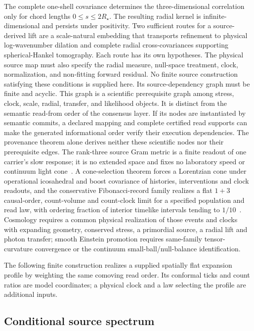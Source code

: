 \documentclass[11pt]{article}
\theoremstyle{remark}
\begin{document}
The complete one-shell covariance determines the three-dimensional correlation
only for chord lengths \(0\le s\le2R_\star\). The resulting radial kernel is
infinite-dimensional and persists under positivity. Two sufficient routes
for a source-derived lift are a scale-natural embedding that transports
refinement to physical log-wavenumber dilation and complete radial
cross-covariances supporting spherical-Hankel tomography. Each route has its
own hypotheses. The physical source map must also specify
the radial measure, null-space treatment, clock, normalization, and non-fitting
forward residual. No finite source construction satisfying these conditions is
supplied here. Its source-dependency graph must be finite and acyclic.
This graph is a scientific prerequisite graph among stress, clock, scale,
radial, transfer, and likelihood objects. It is distinct from the semantic
read-from order of the consensus layer. If its nodes are instantiated by
semantic commits, a declared mapping and complete certified read supports can
make the generated informational order verify their execution dependencies.
The provenance theorem alone derives neither these scientific nodes nor their
prerequisite edges.
The rank-three source Gram metric is a finite readout of one carrier's slow
response; it is no extended space and fixes no laboratory speed or
continuum light cone~\cite{ophEinstein}. A cone-selection theorem
forces a Lorentzian cone under operational icosahedral and boost covariance
of histories, interventions and clock readouts, and the conservative
Fibonacci-record family realizes a flat \(1+3\) causal-order, count-volume
and count-clock limit for a specified population and read law, with
ordering fraction of interior timelike intervals tending to
\(1/10\)~\cite{ophEinstein}. Cosmology requires a common physical realization of
those events and clocks with expanding geometry, conserved stress, a
primordial source, a radial lift and photon transfer; smooth Einstein
promotion requires same-family tensor-curvature convergence or the continuum
small-ball/null-balance identification.

The following finite construction realizes a supplied spatially flat
expansion profile by weighting the same comoving read order. Its conformal
ticks and count ratios are model coordinates; a physical clock and a law
selecting the profile are additional inputs.



\subsection{Conditional source spectrum}
\end{document}
